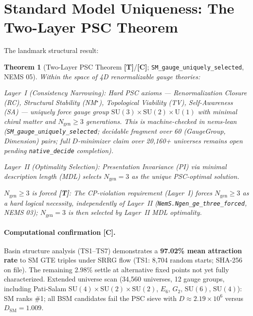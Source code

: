 \documentclass[11pt]{article}
\newcommand{\tagT}{\textbf{[T]}}
\newcommand{\tagC}{\textbf{[C]}}
\theoremstyle{plain}
\newtheorem{theorem}{Theorem}[section]
\theoremstyle{definition}
\theoremstyle{remark}
\begin{document}
\section{Standard Model Uniqueness: The Two-Layer PSC Theorem}
\label{sec:SM}

The landmark structural result:

\begin{theorem}[Two-Layer PSC Theorem \tagT{}/\tagC{}; \texttt{SM\_gauge\_uniquely\_selected}, NEMS 05]
\label{thm:twolayer}
Within the space of 4D renormalizable gauge theories:

\emph{Layer~I (Consistency Narrowing):} Hard PSC axioms --- Renormalization Closure (RC),
Structural Stability (NM$^\star$), Topological Viability (TV), Self-Awareness (SA) ---
uniquely force gauge group $\mathrm{SU}(3)\times\mathrm{SU}(2)\times\mathrm{U}(1)$
with minimal chiral matter and $N_{\mathrm{gen}} \ge 3$ generations.
This is machine-checked in nems-lean (\texttt{SM\_gauge\_uniquely\_selected};
decidable fragment over 60 \emph{(GaugeGroup, Dimension)} pairs; full $D$-minimizer claim
over 20,160+ universes remains open pending \texttt{native\_decide} completion).

\emph{Layer~II (Optimality Selection):} Presentation Invariance (PI) via minimal description
length (MDL) selects $N_{\mathrm{gen}} = 3$ as the unique PSC-optimal solution.

\emph{$N_{\mathrm{gen}} \ge 3$ is forced} \tagT{}: The CP-violation requirement (Layer~I)
forces $N_{\mathrm{gen}} \ge 3$ as a hard logical necessity,
independently of Layer~II (\texttt{NemS.Ngen\_ge\_three\_forced}, NEMS 03);
$N_{\mathrm{gen}} = 3$ is then \emph{selected} by Layer~II MDL optimality.
\end{theorem}

\paragraph{Computational confirmation \tagC{}.}
Basin structure analysis (TS1--TS7) demonstrates a \textbf{97.02\% mean attraction rate}
to SM GTE triples under SRRG flow (TS1: 8,704 random starts; SHA-256 on file).
The remaining 2.98\% settle at alternative fixed points not yet fully characterized.
Extended universe scan (34,560 universes, 12 gauge groups, including
Pati-Salam $\mathrm{SU}(4)\times\mathrm{SU}(2)\times\mathrm{SU}(2)$,
$E_6$, $G_2$, $\mathrm{SU}(6)$, $\mathrm{SU}(4)$):
SM ranks \#1; all BSM candidates fail the PSC sieve with
$D \approx 2.19 \times 10^6$ versus $D_\mathrm{SM} = 1.009$.
\end{document}
